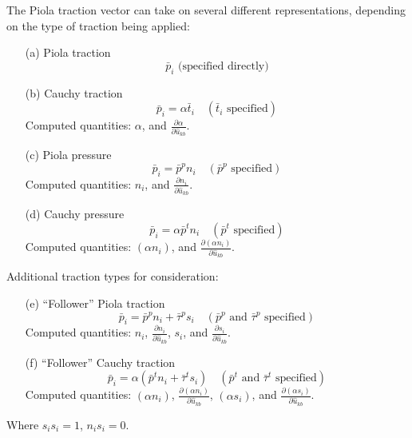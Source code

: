 \documentclass[11pt]{article} %
\begin{document}
The Piola traction vector can take on several different representations, depending on the type of traction being applied:
\begin{itemize}
	\item[(a)] Piola traction
	\begin{equation}
		\bar{p}_i \mbox{ (specified directly)}
	\end{equation}
	\item[(b)] Cauchy traction
	\begin{equation}
		\bar{p}_i = \alpha \bar{t}_i \quad (\bar{t}_i \mbox{ specified})
	\end{equation}
	Computed quantities: $\alpha$, and $\frac{\partial \alpha}{\partial \hat{u}_{kb}}$.
	\item[(c)] Piola pressure
	\begin{equation}
		\bar{p}_i = \bar{p}^p n_i \quad (\bar{p}^p \mbox{ specified})
	\end{equation}
	Computed quantities: $n_i$, and $\frac{\partial n_i}{\partial \hat{u}_{kb}}$.
	\item[(d)] Cauchy pressure
	\begin{equation}
		\bar{p}_i = \alpha \bar{p}^t n_i \quad (\bar{p}^t \mbox{ specified})
	\end{equation}
	Computed quantities: $(\alpha n_i)$, and $\frac{\partial (\alpha n_i)}{\partial \hat{u}_{kb}}$.
\end{itemize}

Additional traction types for consideration:
\begin{itemize}
	\item[(e)] ``Follower'' Piola traction
	\begin{equation}
		\bar{p}_i = \bar{p}^p n_i + \bar{\tau}^p s_i \quad (\bar{p}^p \mbox{ and } \bar{\tau}^p \mbox{ specified})
	\end{equation}
	Computed quantities: $n_i$, $\frac{\partial n_i}{\partial \hat{u}_{kb}}$, $s_i$, and $\frac{\partial s_i}{\partial \hat{u}_{kb}}$.
	\item[(f)] ``Follower'' Cauchy traction
	\begin{equation}
		\bar{p}_i = \alpha(\bar{p}^t n_i + \bar{\tau}^t s_i) \quad (\bar{p}^t \mbox{ and } \bar{\tau}^t \mbox{ specified})
	\end{equation}
	Computed quantities: $(\alpha n_i)$, $\frac{\partial (\alpha n_i)}{\partial \hat{u}_{kb}}$, $(\alpha s_i)$, and $\frac{\partial (\alpha s_i)}{\partial \hat{u}_{kb}}$.
\end{itemize}
Where $s_i s_i = 1$, $n_i s_i = 0$.
\end{document}
